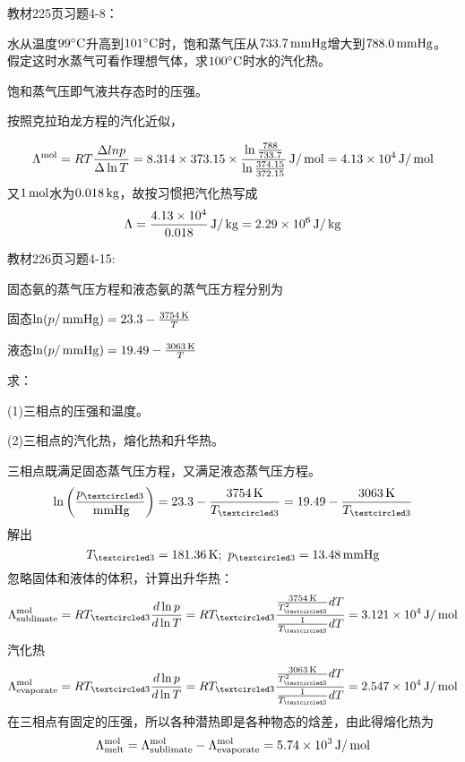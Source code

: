 \documentclass[CJK]{beamer}
\begin{document}
\begin{frame}
  \chtitle{\proid (\sone)}
  \bch
  教材225页习题4-8：

  水从温度$99^\circ \mathrm{C}$升高到$101^\circ \mathrm{C}$时，饱和蒸气压从$733.7\,\mathrm{mmHg}$增大到$788.0\,\mathrm{mmHg}$。假定这时水蒸气可看作理想气体，求$100^\circ \mathrm{C}$时水的汽化热。
  \ech
\end{frame}


\begin{frame}
  \bch
  {\small
  饱和蒸气压即气液共存态时的压强。
  
  按照克拉珀龙方程的汽化近似，
  
  $$\Lambda^{\rm mol} = RT \frac{\Delta ln p}{\Delta \ln T} = 8.314\times 373.15 \times \frac{\ln\frac{788}{733.7}}{\ln\frac{374.15}{372.15}} \,\mathrm{J}/\,\mathrm{mol} = 4.13\times 10^4 \,\mathrm{J}/\,\mathrm{mol}$$
  又$1\,\mathrm{mol}$水为$0.018\,\mathrm{kg}$，故按习惯把汽化热写成
  $$ \Lambda = \frac{4.13\times 10^4}{0.018} \,\mathrm{J}/\,\mathrm{kg} = 2.29\times 10^6 \,\mathrm{J}/\,\mathrm{kg}$$
  }
  \ech
\end{frame}

\begin{frame}
  \chtitle{\proid (\stwo)}
  \bch
  教材226页习题4-15:

  固态氨的蒸气压方程和液态氨的蒸气压方程分别为
  
  固态$\ln(p/\,\mathrm{mmHg}) = 23.3 - \frac{3754\,\mathrm{K}}{T}$

  液态$\ln(p/\,\mathrm{mmHg}) = 19.49 -\frac{3063\,\mathrm{K}}{T}$

  求：

  (1)三相点的压强和温度。

  (2)三相点的汽化热，熔化热和升华热。
  \ech
\end{frame}


\begin{frame}
  \bch
      {\scriptsize
        三相点既满足固态蒸气压方程，又满足液态蒸气压方程。
        $$\ln\left(\frac{\pthree}{\SImmHg}\right) = 23.3-\frac{3754\SIK}{\Tthree} = 19.49 - \frac{3063 \SIK}{\Tthree}$$
        解出
        $$\Tthree = 181.36\SIK;\ \pthree = 13.48\SImmHg$$
        忽略固体和液体的体积，计算出升华热：
        $$\Lambda^{\rm mol}_{\rm sublimate} = R\Tthree \frac{d\ln p}{d\ln T} = R\Tthree \frac{ \frac{3754\SIK }{\Tthree^2} dT }{\frac{1}{\Tthree} dT} = 3.121\times 10^4 \SIJ/\SImol $$
        汽化热
        $$\Lambda^{\rm mol}_{\rm evaporate} = R\Tthree \frac{d\ln p}{d\ln T} = R\Tthree \frac{ \frac{3063\SIK }{\Tthree^2} dT }{\frac{1}{\Tthree} dT} = 2.547\times 10^4 \SIJ/\SImol $$
        在三相点有固定的压强，所以各种潜热即是各种物态的焓差，由此得熔化热为
        $$\Lambda^{\rm mol}_{\rm melt} = \Lambda^{\rm mol}_{\rm sublimate} - \Lambda^{\rm mol}_{\rm evaporate} = 5.74 \times 10^3 \,\mathrm{J}/\,\mathrm{mol}$$
        
      }
  \ech
\end{frame}
\end{document}
